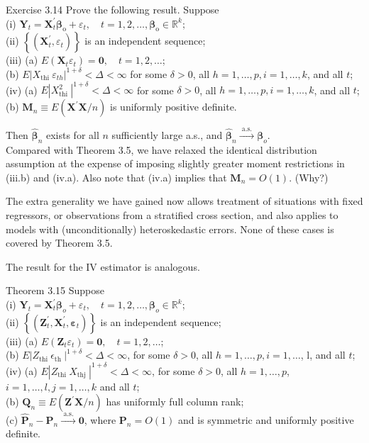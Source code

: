\documentclass[10pt]{article}
\begin{document}
Exercise 3.14 Prove the following result. Suppose\\
(i) $\mathbf{Y}_{t}=\mathbf{X}_{t}^{\prime} \boldsymbol{\beta}_{\mathrm{o}}+\varepsilon_{t}, \quad t=1,2, \ldots, \boldsymbol{\beta}_{\mathrm{o}} \in \mathbb{R}^{k} ;$\\
(ii) $\left\{\left(\mathbf{X}_{t}^{\prime}, \varepsilon_{t}\right)\right\}$ is an independent sequence;\\
(iii) (a) $E\left(\mathbf{X}_{t} \varepsilon_{t}\right)=\mathbf{0}, \quad t=1,2, \ldots$;\\
(b) $E\left|X_{\text {thi }} \varepsilon_{t h}\right|^{1+\delta}<\Delta<\infty$ for some $\delta>0$, all $h=1, \ldots, p, i= 1, \ldots, k$, and all $t$;\\
(iv) (a) $E\left|X_{\text {thi }}^{2}\right|^{1+\delta}<\Delta<\infty$ for some $\delta>0$, all $h=1, \ldots, p, i= 1, \ldots, k$, and all $t$;\\
(b) $\mathbf{M}_{n} \equiv E\left(\mathbf{X}^{\prime} \mathbf{X} / n\right)$ is uniformly positive definite.

Then $\hat{\boldsymbol{\beta}}_{n}$ exists for all $n$ sufficiently large a.s., and $\hat{\boldsymbol{\beta}}_{n} \xrightarrow{\text { a.s. }} \boldsymbol{\beta}_{o}$.\\
Compared with Theorem 3.5, we have relaxed the identical distribution assumption at the expense of imposing slightly greater moment restrictions in (iii.b) and (iv.a). Also note that (iv.a) implies that $\mathbf{M}_{n}=O(1)$. (Why?)

The extra generality we have gained now allows treatment of situations with fixed regressors, or observations from a stratified cross section, and also applies to models with (unconditionally) heteroskedastic errors. None of these cases is covered by Theorem 3.5.

The result for the IV estimator is analogous.

Theorem 3.15 Suppose\\
(i) $\mathbf{Y}_{t}=\mathbf{X}_{t}^{\prime} \boldsymbol{\beta}_{o}+\varepsilon_{t}, \quad t=1,2, \ldots, \boldsymbol{\beta}_{o} \in \mathbb{R}^{k}$;\\
(ii) $\left\{\left(\mathbf{Z}_{t}^{\prime}, \mathbf{X}_{t}^{\prime}, \boldsymbol{\varepsilon}_{t}\right)\right\}$ is an independent sequence;\\
(iii) (a) $E\left(\mathbf{Z}_{t} \varepsilon_{t}\right)=\mathbf{0}, \quad t=1,2, \ldots$;\\
(b) $E\left|Z_{\text {thi }} \epsilon_{\text {th }}\right|^{1+\delta}<\Delta<\infty$, for some $\delta>0$, all $h=1, \ldots, p, i= 1, \ldots$, l, and all $t$;\\
(iv) (a) $E\left|Z_{\text {thi }} X_{\text {thj }}\right|^{1+\delta}<\Delta<\infty$, for some $\delta>0$, all $h=1, \ldots, p$, $i=1, \ldots, l, j=1, \ldots, k$ and all $t$;\\
(b) $\mathbf{Q}_{n} \equiv E\left(\mathbf{Z}^{\prime} \mathbf{X} / n\right)$ has uniformly full column rank;\\
(c) $\hat{\mathbf{P}}_{n}-\mathbf{P}_{n} \xrightarrow{\text { a.s. }} \mathbf{0}$, where $\mathbf{P}_{n}=O(1)$ and is symmetric and uniformly positive definite.
\end{document}
